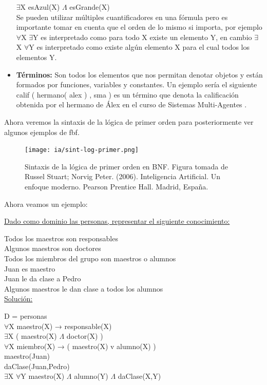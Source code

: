 \documentclass[11pt,fleqn]{book} %
\begin{document}
\begin{itemize}
$\exists$X esAzul(X) $\Lambda$ esGrande(X)\\

Se pueden utilizar múltiples cuantificadores en una fórmula pero es importante tomar en cuenta que el orden de lo mismo si importa, por ejemplo $\forall$X $\exists$Y es interpretado como para todo X existe un elemento Y, en cambio $\exists$X $\forall$Y es interpretado como existe algún elemento X para el cual todos los elementos Y.

\item \textbf{Términos:} Son todos los elementos que nos permitan denotar objetos y están formados por funciones, variables y constantes. Un ejemplo sería el siguiente calif ( hermano( alex ) , sma ) es un término que denota la calificación obtenida por el hermano de Álex en el curso de Sistemas Multi-Agentes \cite{guerra_repcon}.


\end{itemize}

Ahora veremos la sintaxis de la lógica de primer orden para posteriormente ver algunos ejemplos de fbf.

\begin{figure}[ht]
\centering\texttt{[image: ia/sint-log-primer.png]}
\caption{Sintaxis de la lógica de primer orden en BNF. Figura tomada de Russel Stuart; Norvig Peter. (2006). Inteligencia Artificial. Un enfoque moderno. Pearson Prentice Hall. Madrid, España. \cite{russell2004inteligencia} }

\label{fig:sint-log-primer} 
\end{figure}

\clearpage
Ahora veamos un ejemplo:

\underline{Dado como dominio las personas, representar el siguiente conocimiento:}

Todos los maestros son responsables\\
Algunos maestros son doctores\\
Todos los miembros del grupo son maestros o alumnos\\
Juan es maestro\\
Juan le da clase a Pedro\\
Algunos maestros le dan clase a todos los alumnos\\

\underline{Solución:}

D = { personas }\\
$\forall$X maestro(X) → responsable(X)\\
$\exists$X ( maestro(X) $\Lambda$ doctor(X) )\\
$\forall$X miembro(X) → ( maestro(X) v alumno(X) )\\
maestro(Juan)\\
daClase(Juan,Pedro)\\
$\exists$X $\forall$Y maestro(X) $\Lambda$ alumno(Y) $\Lambda$ daClase(X,Y)
\end{document}
